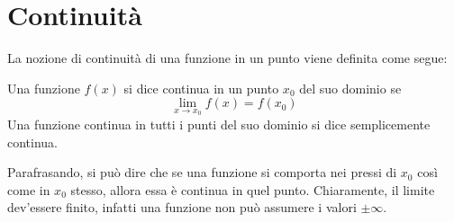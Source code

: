 %
%
%
%


\section{Continuità}
La nozione di continuità di una funzione in un punto viene definita come segue:
\begin{defin}
	\label{defin:continua}
	Una funzione $f(x)$ si dice continua in un punto $x_0$ del suo dominio se
	\[
		\lim_{x\to x_0} f(x) = f(x_0)
	\]
	Una funzione continua in tutti i punti del suo dominio si dice semplicemente continua.
\end{defin}
Parafrasando, si può dire che se una funzione si comporta nei pressi di $x_0$ così come in $x_0$ stesso, allora essa è continua in quel punto. Chiaramente, il limite dev'essere finito, infatti una funzione non può assumere i valori $\pm\infty$.


